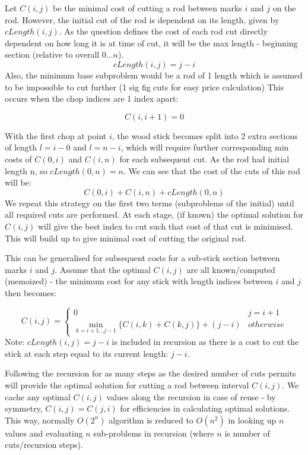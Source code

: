 \documentclass[11pt, a4paper]{article}
\begin{document}
Let $C(i,j)$ be the minimal cost of cutting a rod between marks $i$ and $j$ on the rod. However, the initial cut of the rod is dependent on its length, given by $cLength(i, j)$. As the question defines the cost of each rod cut directly dependent on how long it is at time of cut, it will be the max length - beginning section (relative to overall $0 \dots n$). 
\[cLength(i, j) = j - i\]
Also, the minimum base subproblem would be a rod of 1 length which is assumed to be impossible to cut further (1 sig fig cuts for easy price calculation)
This occurs when the chop indices are 1 index apart:

\[C(i, i+1) = 0\]

With the first chop at point $i$, the wood stick becomes split into 2 extra sections of length $l = i - 0$ and $ l = n - i$, which will require further corresponding min costs of $C(0, i)$ and $C(i, n)$ for each subsequent cut. As the rod had initial length n, so $cLength(0, n) = n$.
We can see that the cost of the cuts of this rod will be:
\[ C(0, i) + C(i, n) + cLength(0, n) \]
We repeat this strategy on the first two terms (subproblems of the initial) until all required cuts are performed. At each stage, (if known) the optimal solution for $C(i,j)$ will give the best index to cut such that cost of that cut is minimised. This will build up to give minimal cost of cutting the original rod.
 
This can be generalised for subsequent costs for a sub-stick section between marks $i$ and $j$.
Assume that the optimal $C(i,j)$ are all known/computed (memoized) - the minimum cost for any stick with length indices between $i$ and $j$ then becomes:

\[ C(i, j) = \begin{cases}
        0 & j = i + 1 \\
    \min \limits_{k = i + 1 \dots j - 1} \{C(i, k) + C(k, j) \} + (j - i) & otherwise
        \end{cases}
\]
Note: $cLength(i, j) = j - i$ is included in recursion as there is a cost to cut the stick at each step equal to its current length: $j - i$.

Following the recursion for as many steps as the desired number of cuts permits will provide the optimal solution for cutting a rod between interval $C(i, j)$. We cache any optimal $C(i, j)$ values along the recursion in case of reuse - by symmetry, $C(i, j) = C(j, i)$ for efficiencies in calculating optimal solutions. This way, normally $O(2^n)$ algorithm is reduced to $O(n^2)$ in looking up $n$ values and evaluating $n$ sub-problems in recursion (where $n$ is number of cuts/recursion steps).
\end{document}
